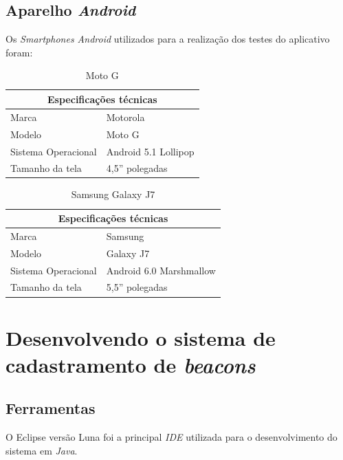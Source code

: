 \subsection{Aparelho \textit{Android}}
Os \textit{Smartphones Android} utilizados para a realização dos testes do aplicativo foram:

\begin{table}[H]
    \centering
    \begin{tabular}{|p{7cm}|p{7cm}|}
        \hline
        \multicolumn{2}{|c|}{Especificações técnicas} \\ 
        \hline
        Marca & Motorola \\
        \hline
        Modelo & Moto G \\
        \hline
        Sistema Operacional & Android 5.1 Lollipop \\
        \hline
        Tamanho da tela & 4,5'' polegadas \\
        \hline
    \end{tabular}
    \caption{Moto G}
    \label{tab:phone1}
\end{table}

\begin{table}[H]
    \centering
    \begin{tabular}{|p{7cm}|p{7cm}|}
        \hline
        \multicolumn{2}{|c|}{Especificações técnicas} \\ 
        \hline
        Marca & Samsung\\
        \hline
        Modelo & Galaxy J7\\
        \hline
        Sistema Operacional & Android 6.0 Marshmallow\\
        \hline
        Tamanho da tela &  5,5'' polegadas\\
        \hline
    \end{tabular}
    \caption{Samsung Galaxy J7}
    \label{tab:phone2}
\end{table}

\section{Desenvolvendo o sistema de cadastramento de \textit{beacons}}

\subsection{Ferramentas}
O Eclipse versão Luna foi a principal \textit{IDE} utilizada para o desenvolvimento do sistema em \textit{Java}.

